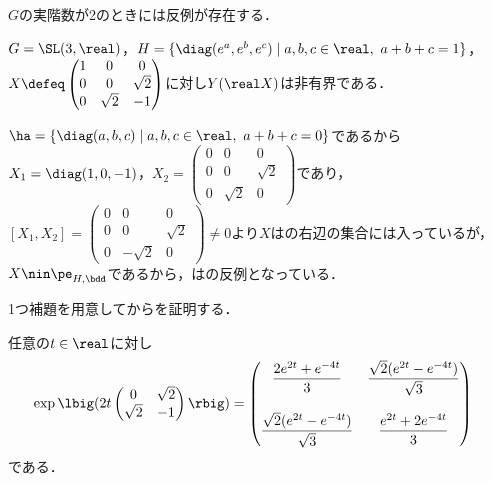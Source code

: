 $G$の実階数が2のときには反例が存在する．

\begin{prop}\label{prop:0114}
  $G = \SL(3,\real) $，$H = \{\diag(e^a,e^b,e^c)\mid a,b,c\in \real,\ a+ b + c = 1 \} $，$X\defeq
  \begin{pmatrix}
    1 & 0 & 0 \\
    0 & 0 & \sqrt{2} \\
    0 & \sqrt{2} & -1
  \end{pmatrix}
  $に対し$Y(\real X) $は非有界である．
\end{prop}


$\ha = \{\diag(a,b,c)\mid a,b,c\in \real,\ a +b + c = 0 \}  $であるから$X_1 = \diag(1,0,-1)$，$X_2 = \begin{pmatrix}
  0 & 0 & 0 \\
  0 & 0 & \sqrt{2} \\
  0 & \sqrt{2} & 0
\end{pmatrix}$であり，$[X_1, X_2] = \begin{pmatrix}
  0 & 0 & 0 \\
  0 & 0 & \sqrt{2} \\
  0 & -\sqrt{2} & 0
\end{pmatrix} \neq 0$より$X$はの右辺の集合には入っているが，$X\nin \pe_{H,\bdd} $であるから，はの反例となっている．

1つ補題を用意してからを証明する．
\begin{lem}\label{lem:0114}
  任意の$t\in \real$に対し
  \begin{align*}
    \exp\lbig(2t\begin{pmatrix}
      0 & \sqrt{2} \\
      \sqrt{2} & -1 
    \end{pmatrix}\rbig) &=
                 \begin{pmatrix}
                   \dfrac{2e^{2t} + e^{-4t}}{3} &  \dfrac{\sqrt{2} (e^{2t} - e^{-4t})}{\sqrt{3}}\\
                   \\
                   \dfrac{\sqrt{2} (e^{2t} - e^{-4t})}{\sqrt{3}} & \dfrac{e^{2t} + 2e^{-4t}}{3}
                 \end{pmatrix}
  \end{align*}
  である．
\end{lem}

